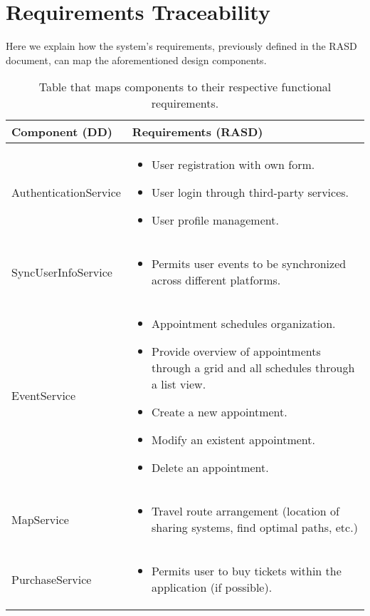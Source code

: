 \chapter{Requirements Traceability}
\label{cha:req_trace}

Here we explain how the system's requirements, previously defined in the RASD document, can map the aforementioned design components.

\begin{table}[h]
\begin{center}
\begin{tabular}{|l|m{}|}
\hline
{\bf Component (DD)}  & {\bf Requirements (RASD)}\\
\hline
AuthenticationService & \begin{itemize} \item User registration with own form. \item User login through third-party services. \item User profile management. \end{itemize} \\
\hline
SyncUserInfoService & \begin{itemize} \item Permits user events to be synchronized across different platforms. \end{itemize} \\
\hline
EventService & \begin{itemize} \item Appointment schedules organization. \item Provide overview of appointments through a grid and all schedules through a list view. \item Create a new appointment. \item Modify an existent appointment. \item Delete an appointment. \end{itemize} \\
\hline
MapService & \begin{itemize} \item Travel route arrangement (location of sharing systems, find optimal paths, etc.) \end{itemize} \\
\hline
PurchaseService & \begin{itemize} \item Permits user to buy tickets within the application (if possible).
\end{itemize} \\
\hline
\end{tabular}
\caption{Table that maps components to their respective functional requirements.}
\label{tab:comparisontable}
\end{center}
\end{table}
